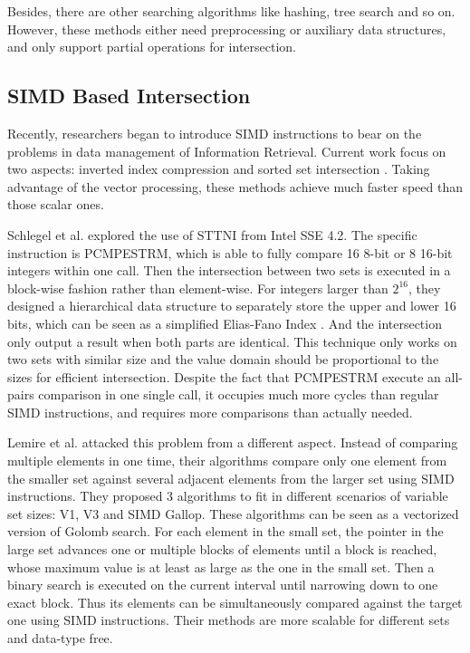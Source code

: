 \documentclass[runningheads,a4paper]{llncs}
\begin{document}
Besides, there are other searching algorithms like hashing, tree search and so on.
However, these methods either need preprocessing or auxiliary data structures, and only support partial operations for intersection.
\subsection{SIMD Based Intersection}
Recently, researchers began to introduce SIMD instructions to bear on the problems in data management of Information Retrieval.
Current work focus on two aspects: inverted index compression \cite{lemire2015decoding,stepanov2011simd,trotman2014compression} and sorted set intersection \cite{lemire2016simd,Inoue2014Faster,Schlegel2011Fast}.
Taking advantage of the vector processing, these methods achieve much faster speed than those scalar ones.

Schlegel et al. \cite{Schlegel2011Fast} explored the use of STTNI from Intel SSE 4.2.
The specific instruction is \textsf{PCMPESTRM}, which is able to fully compare 16 8-bit or 8 16-bit integers within one call.
Then the intersection between two sets is executed in a block-wise fashion rather than element-wise.
For integers larger than $ 2^{16} $, they designed a hierarchical data structure to separately store the upper and lower 16 bits, which can be seen as a simplified Elias-Fano Index \cite{ottaviano2014partitioned,vigna2013quasi}.
And the intersection only output a result when both parts are identical.
This technique only works on two sets with similar size and the value domain should be proportional to the sizes for efficient intersection.
Despite the fact that \textsf{PCMPESTRM} execute an all-pairs comparison in one single call, it occupies much more cycles than regular SIMD instructions, and requires more comparisons than actually needed.

Lemire et al. \cite{lemire2016simd} attacked this problem from a different aspect.
Instead of comparing multiple elements in one time, their algorithms compare only one element from the smaller set against several adjacent elements from the larger set using SIMD instructions.
They proposed 3 algorithms to fit in different scenarios of variable set sizes: V1, V3 and SIMD Gallop.
These algorithms can be seen as a vectorized version of Golomb search.
For each element in the small set, the pointer in the large set advances one or multiple blocks of elements until a block is reached, whose maximum value is at least as large as the one in the small set.
Then a binary search is executed on the current interval until narrowing down to one exact block.
Thus its elements can be simultaneously compared against the target one using SIMD instructions.
Their methods are more scalable for different sets and data-type free.
\end{document}
